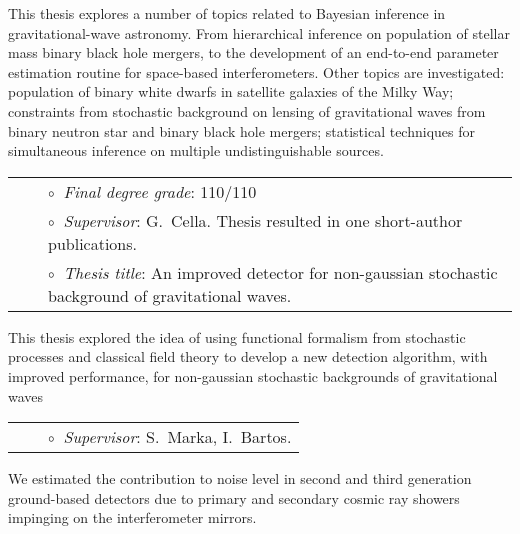 This thesis explores a number of topics related to Bayesian inference in gravitational-wave astronomy. From hierarchical inference on population of stellar mass binary black hole mergers, to the development of an end-to-end parameter estimation routine for space-based interferometers. Other topics are investigated: population of binary white dwarfs in satellite galaxies of the Milky Way; constraints from stochastic background on lensing of gravitational waves from binary neutron star and binary black hole mergers; statistical techniques for simultaneous inference on multiple undistinguishable sources.

\vspace{0.2cm}
\vspace{-0.1cm}
\begin{tabular}{rcl}
&\hspace{0.4cm} &$\circ\;\;${\textit{Final degree grade}}: 110/110\\
&\hspace{0.4cm} &$\circ\;\;${\textit{Supervisor}}: G.~Cella. Thesis resulted in one short-author publications.\\
&\hspace{0.4cm} &$\circ\;\;${\textit{Thesis title}}: An improved detector for non-gaussian stochastic background of gravitational waves.
\end{tabular}
\vspace{0.2cm}

This thesis explored the idea of using functional formalism from stochastic processes and classical field theory to develop a new detection algorithm, with improved performance, for non-gaussian stochastic backgrounds of gravitational waves

\vspace{0.2cm}
\vspace{-0.1cm}
\begin{tabular}{rcl}
&\hspace{0.4cm} &$\circ\;\;${\textit{Supervisor}}: S.~Marka, I.~Bartos.
\end{tabular}
\vspace{0.2cm}

We estimated the contribution to noise level in second and third generation ground-based detectors due to primary and secondary cosmic ray showers impinging on the interferometer mirrors.


